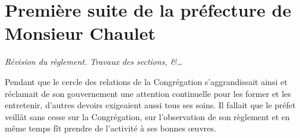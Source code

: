 \chapter{Première suite de la préfecture de Monsieur Chaulet}
\begin{center}
\textit{Révision du règlement. Travaux des sections, \&…}
\end{center}

Pendant que le cercle des relations de la Congrégation s'aggrandissait ainsi et réclamait de son gouvernement une attention continuelle pour les former et les entretenir, d'autres
devoirs exigeaient aussi tous ses soins. Il fallait que le préfet veillât sans cesse sur la Congrégation, sur l'observation de son règlement et en même temps fît prendre de l'activité à ses bonnes œuvres.


